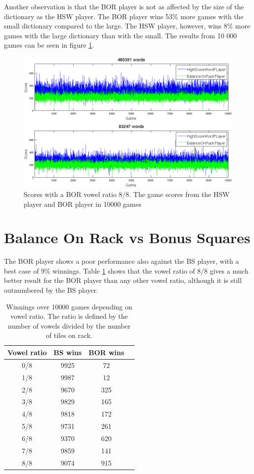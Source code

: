 \documentclass[a4paper, 12pt]{report}
\begin{document}
Another observation is that the BOR player is not as affected by the size of the dictionary as the HSW player. The BOR player wins 53\% more games with the small dictionary compared to the large. The HSW player, however, wins 8\% more games with the large dictionary than with the small. The results from 10 000 games can be seen in figure \ref{fig:highBalanceBothDict}.

\graphicspath{{../results/Plots/}}

\begin{figure}[h]
\centering
\includegraphics[scale=0.4]{HighBalance8vow_bothDict_cropped}
\caption {Scores with a BOR vowel ratio 8/8. The game scores from the HSW player and BOR player in 10000 games}
\label{fig:highBalanceBothDict}
\end{figure}




\section{Balance On Rack vs Bonus Squares}
\label{sec:balanceBonus}
The BOR player shows a poor performance also against the BS player, with a best case of 9\% winnings. Table \ref{tab:bor+bs} shows that the vowel ratio of 8/8 gives a much better result for the BOR player than any other vowel ratio, although it is still outnumbered by the BS player.

\begin{table}[h]
\centering
    \begin{tabular}{ c | c | c  p{5cm}}
   	Vowel ratio & BS wins & BOR wins \\ \hline
	0/8 & 9925 & 72 \\ 
    	1/8 & 9987 & 12 \\ 
    	2/8 & 9670 & 325 \\ 
    	3/8 & 9829 & 165 \\ 
	4/8 & 9818 & 172 \\ 
	5/8 & 9731 & 261 \\ 
	6/8 & 9370 & 620 \\ 
	7/8 & 9859 & 141 \\ 
	8/8 & 9074 & 915 \\ 
    \end{tabular}
\caption{Winnings over 10000 games depending on vowel ratio. The ratio is defined by the number of vowels divided by the number of tiles on rack.}
\label{tab:bor+bs}
\end{table}
\end{document}
